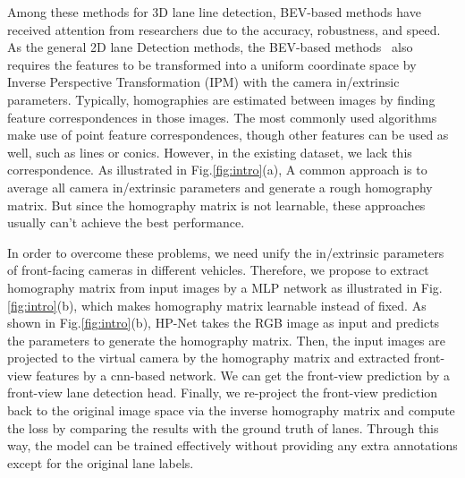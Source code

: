 Among these methods for 3D lane line detection, BEV-based methods have received attention from researchers due to the accuracy, robustness, and speed.
As the general 2D lane Detection methods, the BEV-based methods~\cite{chen2022persformer, efrat20203d, guo2020gen, liu2022learning, wang2023bev} also requires the features to be transformed into a uniform coordinate space by Inverse Perspective Transformation (IPM) with the camera in/extrinsic parameters.
Typically, homographies are estimated between images by finding feature correspondences in those images.
The most commonly used algorithms make use of point feature correspondences, though other features can be used as well, such as lines or conics.
However, in the existing dataset, we lack this correspondence.
As illustrated in Fig.\ref{fig:intro}(a)\@, A common approach is to average all camera in/extrinsic parameters and generate a rough homography matrix.
But since the homography matrix is not learnable, these approaches usually can't achieve the best performance.


In order to overcome these problems, we need unify the in/extrinsic parameters of front-facing cameras in different vehicles.
Therefore, we propose to extract homography matrix from input images by a MLP network as illustrated in Fig.\ref{fig:intro}(b)\@,
which makes homography matrix learnable instead of fixed.
As shown in Fig.\ref{fig:intro}(b)\@, HP-Net takes the RGB image as input and predicts the parameters to generate the homography matrix.
Then, the input images are projected to the virtual camera by the homography matrix and extracted front-view features by a cnn-based network.
We can get the front-view prediction by a front-view lane detection head.
Finally, we re-project the front-view prediction back to the original image space via the inverse homography matrix
and compute the loss by comparing the results with the ground truth of lanes.
Through this way, the model can be trained effectively without providing any extra annotations except for the original lane labels.


